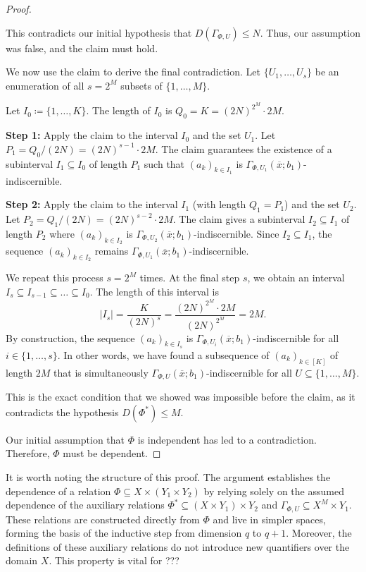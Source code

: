 \begin{proof}
\begin{subproof}
        This contradicts our initial hypothesis that $D(\Gamma_{\Phi,U}) \leq N$. Thus, our assumption was false, and the claim must hold.
    \end{subproof}

    We now use the claim to derive the final contradiction. Let $\{U_1, \dots, U_s\}$ be an enumeration of all $s=2^M$ subsets of $\{1, \dots, M\}$.

    Let $I_0 \coloneq \{1, \dots, K\}$. The length of $I_0$ is $Q_0 = K = (2N)^{2^M} \cdot 2M$.

    \textbf{Step 1:} Apply the claim to the interval $I_0$ and the set $U_1$. Let $P_1 = Q_0 / (2N) = (2N)^{s-1} \cdot 2M$. The claim guarantees the existence of a subinterval $I_1 \subseteq I_0$ of length $P_1$ such that $(a_k)_{k \in I_1}$ is $\Gamma_{\Phi,U_1}(\overline{x}; b_1)$-indiscernible.

    \textbf{Step 2:} Apply the claim to the interval $I_1$ (with length $Q_1 = P_1$) and the set $U_2$. Let $P_2 = Q_1 / (2N) = (2N)^{s-2} \cdot 2M$. The claim gives a subinterval $I_2 \subseteq I_1$ of length $P_2$ where $(a_k)_{k \in I_2}$ is $\Gamma_{\Phi,U_2}(\overline{x}; b_1)$-indiscernible. Since $I_2 \subseteq I_1$, the sequence $(a_k)_{k \in I_2}$ remains $\Gamma_{\Phi,U_1}(\overline{x}; b_1)$-indiscernible.

    We repeat this process $s = 2^M$ times. At the final step $s$, we obtain an interval $I_s \subseteq I_{s-1} \subseteq \dots \subseteq I_0$. The length of this interval is
    \[
        |I_s| = \frac{K}{(2N)^s} = \frac{(2N)^{2^M} \cdot 2M}{(2N)^{2^M}} = 2M.
    \]
    By construction, the sequence $(a_k)_{k \in I_s}$ is $\Gamma_{\Phi,U_i}(\overline{x}; b_1)$-indiscernible for all $i \in \{1, \dots, s\}$. In other words, we have found a subsequence of $(a_k)_{k \in [K]}$ of length $2M$ that is simultaneously $\Gamma_{\Phi,U}(\overline{x}; b_1)$-indiscernible for all $U \subseteq \{1, \dots, M\}$.

    This is the exact condition that we showed was impossible before the claim, as it contradicts the hypothesis $D(\Phi^*) \leq M$.

    Our initial assumption that $\Phi$ is independent has led to a contradiction. Therefore, $\Phi$ must be dependent.


\end{proof}

\begin{remark}
    It is worth noting the structure of this proof. The argument establishes the dependence of a relation $\Phi \subseteq X \times (Y_1 \times Y_2)$ by relying solely on the assumed dependence of the auxiliary relations $\Phi^* \subseteq (X \times Y_1) \times Y_2$ and $\Gamma_{\Phi,U} \subseteq X^M \times Y_1$. These relations are constructed directly from $\Phi$ and live in simpler spaces, forming the basis of the inductive step from dimension $q$ to $q+1$. Moreover, the definitions of these auxiliary relations do not introduce new quantifiers over the domain $X$. This property is vital for ???

\end{remark}

